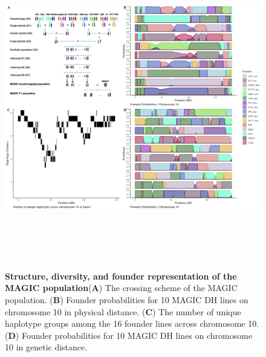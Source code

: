 \documentclass[article,9pt,twocolumn,twoside]{rilabRxiv}
\begin{document}
\begin{figure}[ht!]
\centering
\includegraphics[width=\textwidth,height=14cm]{figures/Methods_Fig1.png}
\caption{\textbf{Structure, diversity, and founder representation of the MAGIC population}(\textbf{A}) The crossing scheme of the MAGIC population. (\textbf{B}) Founder probabilities for 10 MAGIC DH lines on chromosome 10 in physical distance. (\textbf{C}) The number of unique haplotype groups among the 16 founder lines across chromosome 10. (\textbf{D}) Founder probabilities for 10 MAGIC DH lines on chromosome 10 in genetic distance.}
\label{fig:figure1}
\end{figure}
\end{document}
